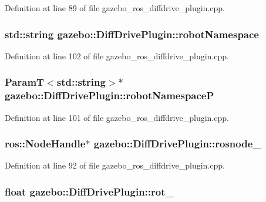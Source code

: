 Definition at line 89 of file gazebo\_\-ros\_\-diffdrive\_\-plugin.cpp.

\subsubsection[{robotNamespace}]{\setlength{\rightskip}{0pt plus 5cm}std::string {\bf gazebo::DiffDrivePlugin::robotNamespace}\hspace{0.3cm}{\ttfamily  [private]}}\label{classgazebo_1_1DiffDrivePlugin_ac2bb267616db23fc332f621c17ee6867}


Definition at line 102 of file gazebo\_\-ros\_\-diffdrive\_\-plugin.cpp.

\subsubsection[{robotNamespaceP}]{\setlength{\rightskip}{0pt plus 5cm}ParamT$<$std::string$>$$\ast$ {\bf gazebo::DiffDrivePlugin::robotNamespaceP}\hspace{0.3cm}{\ttfamily  [private]}}\label{classgazebo_1_1DiffDrivePlugin_ad17a6252d9dddbb82e63e22af1b0abb2}


Definition at line 101 of file gazebo\_\-ros\_\-diffdrive\_\-plugin.cpp.

\subsubsection[{rosnode\_\-}]{\setlength{\rightskip}{0pt plus 5cm}ros::NodeHandle$\ast$ {\bf gazebo::DiffDrivePlugin::rosnode\_\-}\hspace{0.3cm}{\ttfamily  [private]}}\label{classgazebo_1_1DiffDrivePlugin_a3f95546ce1d727b092e065ad363c66a1}


Definition at line 92 of file gazebo\_\-ros\_\-diffdrive\_\-plugin.cpp.

\subsubsection[{rot\_\-}]{\setlength{\rightskip}{0pt plus 5cm}float {\bf gazebo::DiffDrivePlugin::rot\_\-}\hspace{0.3cm}{\ttfamily  [private]}}\label{classgazebo_1_1DiffDrivePlugin_adb1a1a181fda6e8bd94c8924cc62269c}


